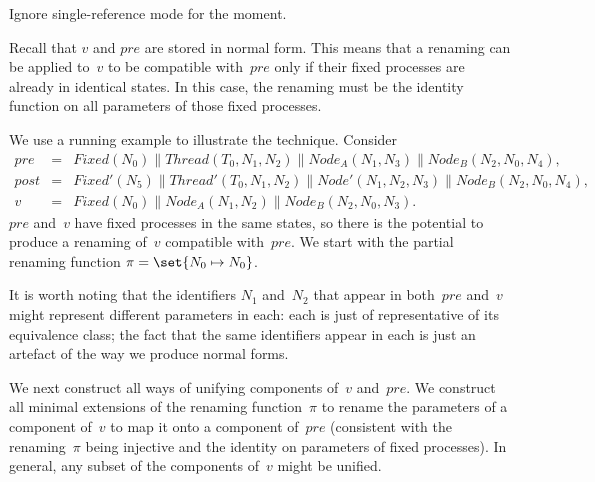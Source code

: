 Ignore single-reference mode for the moment. 

Recall that $v$ and $pre$ are stored in normal form.  This means that a
renaming can be applied to~$v$ to be compatible with~$pre$ only if their fixed
processes are already in identical states.  In this case, the renaming must be
the identity function on all parameters of those fixed processes.


\begin{example}
We use a running example to illustrate the technique.  Consider
\begin{eqnarray*}
pre & = &
   Fixed(N_0) \parallel Thread(T_0, N_1, N_2) \parallel 
   Node_A(N_1, N_3) \parallel Node_B(N_2, N_0, N_4), 
\\
post & = & 
  Fixed'(N_5) \parallel Thread'(T_0, N_1, N_2) \parallel
  Node'(N_1, N_2, N_3) \parallel Node_B(N_2, N_0, N_4) ,
\\
v & = & 
  Fixed(N_0) \parallel Node_A(N_1, N_2) \parallel Node_B(N_2, N_0, N_3).
\end{eqnarray*}
%
$pre$ and~$v$ have fixed processes in the same states, so there is the
potential to produce a renaming of~$v$ compatible with~$pre$.  We start with
the partial renaming function $\pi = \set{N_0 \mapsto N_0}$.

It is worth noting that the identifiers $N_1$ and~$N_2$ that appear in
both~$pre$ and~$v$ might represent different parameters in each: each is just
of representative of its equivalence class; the fact that the same identifiers
appear in each is just an artefact of the way we produce normal forms. 
\end{example}


We next construct all ways of unifying components of~$v$ and~$pre$.  We
construct all minimal extensions of the renaming function~$\pi$ to rename the
parameters of a component of~$v$ to map it onto a component of~$pre$
(consistent with the renaming~$\pi$ being injective and the identity on
parameters of fixed processes).  In general, any subset of the components
of~$v$ might be unified. 

